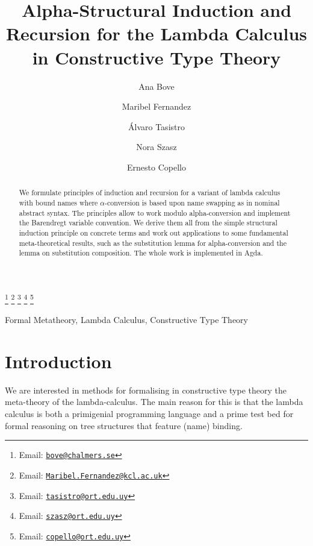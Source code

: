 \documentclass{entcs}
\newcommand{\alp}{\ensuremath{\alpha}}
\begin{document}
\begin{frontmatter}
 \title{Alpha-Structural Induction and Recursion for the Lambda Calculus in Constructive Type Theory}
  \author{Ana Bove }
  \address{Chalmers University of Technology\\
    Gothenburg, Sweden}
  \author{Maribel Fernandez }
  \address{King's College London\\
      London, England}
  \author{\'Alvaro Tasistro }
  \author{Nora Szasz }
  \author{Ernesto Copello }
  \address{Universidad ORT Uruguay\\
      Montevideo, Uruguay}
  \thanks[emailB]{Email: \href{mailto:bove@chalmers.se} {\texttt{\normalshape bove@chalmers.se}}}
  \thanks[emailF]{Email: \href{mailto:Maribel.Fernandez@kcl.ac.uk} {\texttt{\normalshape Maribel.Fernandez@kcl.ac.uk}}}
  \thanks[emailT]{Email: \href{mailto:tasistro@ort.edu.uy} {\texttt{\normalshape tasistro@ort.edu.uy}}} 
  \thanks[emailS]{Email: \href{mailto:szasz@ort.edu.uy} {\texttt{\normalshape szasz@ort.edu.uy}}}
  \thanks[emailC]{Email: \href{mailto:copello@ort.edu.uy} {\texttt{\normalshape copello@ort.edu.uy}}}

\begin{abstract} 
We formulate principles of induction and recursion for a variant of lambda calculus with bound names where \alp-conversion is based upon name swapping as in nominal abstract syntax. The principles allow to work modulo alpha-conversion and implement the Barendregt variable convention. We derive them all from the simple structural induction principle on concrete terms and work out applications to some fundamental meta-theoretical results, such as the substitution lemma for alpha-conversion and the lemma on substitution composition. The whole work is implemented in Agda.
\end{abstract}

\begin{keyword}
Formal Metatheory, Lambda Calculus, Constructive Type Theory
\end{keyword}

\end{frontmatter}

\maketitle

\section{Introduction}
\label{sec:intro}
We are interested in methods for formalising in constructive type theory the meta-theory of the lambda-calculus. The main reason for this is that the lambda calculus is both a primigenial programming language and a prime test bed
for formal reasoning on tree structures that feature (name) binding. 
\end{document}
